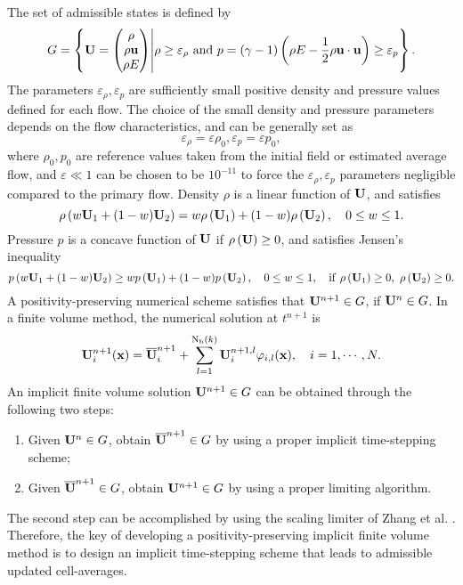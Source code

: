 The set of admissible states is defined by
\begin{equation}
    G= \left\{
    \mathbf{U} =  \begin{pmatrix}
        \rho \\ \rho \mathbf{u} \\ \rho E
    \end{pmatrix} \middle|
    \rho \geq \varepsilon_\rho
    \text{ and }
    p=\left(\gamma-1\right) \left(\rho E - \dfrac{1}{2} \rho \mathbf{u} \cdot \mathbf{u}\right) \geq \varepsilon_p
    \right\}.
\end{equation}
The parameters $\varepsilon_\rho, \varepsilon_p$
are sufficiently small positive density and pressure values
defined for each flow.
The choice of the small density and pressure parameters
depends on the flow characteristics, and can be generally set as
$$
    \varepsilon_\rho=\varepsilon \rho_0, \varepsilon_p=\varepsilon p_0,
$$
where $\rho_0, p_0$ are reference values taken from the initial field or estimated average flow,
and $\varepsilon\ll 1$ can be chosen to be $10^{-11}$ to force the $\varepsilon_\rho,\varepsilon_p$ parameters negligible
compared to the primary flow.
Density $\rho$ is a linear function of $\mathbf{U}$, and satisfies
\begin{equation}
    \label{eq:density-linear}
    \rho\left(w\mathbf{U}_1+(1-w)\mathbf{U}_2\right) = w\rho\left(\mathbf{U}_1\right) + (1-w) \rho \left(\mathbf{U}_2\right) , \quad 0 \leq w \leq 1.
\end{equation}
Pressure $p$ is a concave function of $\mathbf{U}$ if $\rho\left(\mathbf{U}\right) \geq 0$, and satisfies Jensen's inequality
\begin{equation}
    \label{eq:pressure-Jensen}
    p \left(w\mathbf{U}_1+(1-w)\mathbf{U}_2\right)  \geq w p\left(\mathbf{U}_1\right) + (1-w) p \left(\mathbf{U}_2\right), \quad 0 \leq w \leq 1, \quad \mathrm{if} \ \rho\left(\mathbf{U}_1\right) \geq 0, \ \rho\left(\mathbf{U}_2\right) \geq 0.
\end{equation}
A positivity-preserving numerical scheme satisfies that $\mathbf{U}^{n+1} \in G$, if $\mathbf{U}^{n} \in G$.  In a finite volume method, the numerical solution at $t^{n+1}$ is
\begin{equation}
    \mathbf{U}^{n+1}_i (\mathbf{x})= \overline{\mathbf{U}}^{n+1}_i + \sum_{l=1}^{\mathrm{N_b}(k)}{\mathbf{U}_i^{n+1,l} \varphi_{i,l}(\mathbf{x}) }, \quad i=1, \cdots,N.
\end{equation}
An implicit finite volume solution $\mathbf{U}^{n+1} \in G$ can be obtained through the following two steps:
\begin{enumerate}[label=(\arabic*)]
    \item Given $\mathbf{U}^n \in G$, obtain $\overline{\mathbf{U}}^{n+1} \in G$ by using a proper implicit time-stepping scheme;
    \item Given $\overline{\mathbf{U}}^{n+1} \in G$, obtain $\mathbf{U}^{n+1} \in G$ by using a proper limiting algorithm.
\end{enumerate}
The second step can be accomplished by using the scaling limiter of Zhang et al. \cite{zhang2010positivity}. Therefore, the key of developing a positivity-preserving implicit finite volume method is to design an implicit time-stepping scheme that leads to admissible updated cell-averages.

